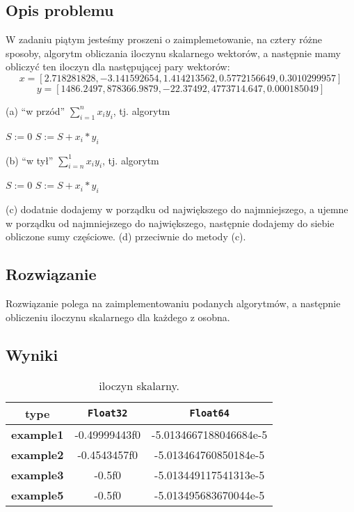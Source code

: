 \documentclass{article}
\begin{document}
\begin{center}
    \subsection{Opis problemu}
    \large W zadaniu piątym jesteśmy proszeni o zaimplemetowanie, na cztery różne sposoby, algorytm obliczania iloczynu skalarnego 
     wektorów, a następnie mamy obliczyć ten iloczyn dla następującej pary wektorów:
     \[\displaystyle x = [2.718281828, -3.141592654, 1.414213562, 0.5772156649, 0.3010299957]\]
     \[\displaystyle y = [1486.2497, 878366.9879, -22.37492, 4773714.647, 0.000185049]\]
     \begin{flushleft}
        \vspace*{1cm}
        (a) ``w przód'' \(\textstyle \sum_{i=1}^n x_{i}y_{i}\), tj. algorytm
        \begin{algorithmic}
        \State$S:=0$
            \State $S:=S+x_{i}*y_{i}$
        \EndFor
        \end{algorithmic}
        \vspace*{1cm}
        (b) ``w tył'' \(\textstyle \sum_{i=n}^1 x_{i}y_{i}\), tj. algorytm
        \begin{algorithmic}
            \State$S:=0$
                \State $S:=S+x_{i}*y_{i}$
            \EndFor
            \end{algorithmic}
        \vspace*{1cm}
        (c) dodatnie dodajemy w porządku od największego do najmniejszego, a ujemne w porządku od najmniejszego do największego,
        następnie dodajemy do siebie obliczone sumy częściowe.\newline
        (d) przeciwnie do metody (c). \newpage
     \end{flushleft}
    \subsection{Rozwiązanie}
    \large Rozwiązanie polega na zaimplementowaniu podanych algorytmów, a następnie obliczeniu iloczynu skalarnego dla każdego z osobna.
    \subsection{Wyniki}

    \begin{table}[h!]
    \centering
    \begin{tabular}{||c c c||} 
    \hline
    \textbf{type} & \texttt{Float32} & \texttt{Float64} \\ [0.5ex]
    \hline\hline
    \textbf{example1} & -0.49999443f0 & -5.0134667188046684e-5 \\ 
    \textbf{example2} & -0.4543457f0 & -5.013464760850184e-5 \\ 
    \textbf{example3} & -0.5f0 & -5.013449117541313e-5 \\ 
    \textbf{example5} & -0.5f0 & -5.013495683670044e-5 \\ 
    \hline
    \end{tabular}
    \caption{iloczyn skalarny.}
    \label{table:5}
    \end{table}


\end{center}
\end{document}
